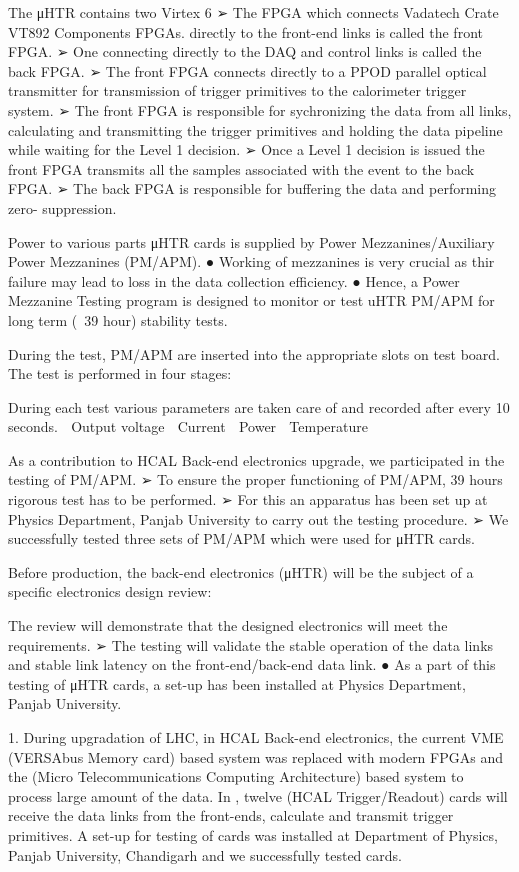 The μHTR contains two Virtex 6
➢ The FPGA which connects
Vadatech Crate VT892
Components
FPGAs.
directly to the front-end links is called the front
FPGA.
➢ One connecting directly to the DAQ and control links is called the back FPGA.
➢ The front FPGA connects directly to a PPOD parallel optical transmitter for
transmission of trigger primitives to the calorimeter trigger system.
➢ The front FPGA is responsible for sychronizing the data from all links,
calculating and transmitting the trigger primitives and holding the data pipeline
while waiting for the Level 1 decision.
➢ Once a Level 1 decision is issued the front FPGA transmits all the samples
associated with the event to the back FPGA.
➢ The back FPGA is responsible for buffering the data and performing zero-
suppression.

Power
to various parts μHTR cards is supplied by Power
Mezzanines/Auxiliary Power Mezzanines (PM/APM).
● Working of mezzanines is very crucial as thir failure may lead to loss in
the data collection efficiency.
● Hence, a Power Mezzanine Testing program is designed to monitor or test
uHTR PM/APM for long term (~39 hour) stability tests.


During
the test, PM/APM are inserted into the appropriate slots on test
board. The test is performed in four stages:

During
each test various parameters are taken care of and recorded after
every 10 seconds.
 Output voltage
 Current
 Power
 Temperature

As
a contribution to HCAL Back-end electronics upgrade, we participated
in the testing of PM/APM.
➢ To
ensure the proper functioning of PM/APM, 39 hours rigorous test
has to be performed.
➢ For this an apparatus has been set up at Physics Department, Panjab
University to carry out the testing procedure.
➢ We successfully tested three sets of PM/APM which were used for
μHTR cards.

Before
production, the back-end electronics (μHTR) will be the subject of a
specific electronics design review:

The
review will demonstrate that the designed electronics will meet the
requirements.
➢ The testing will validate the stable operation of the data links and
stable link latency on the front-end/back-end data link.
● As
a part of this testing of μHTR cards, a set-up has been installed at
Physics Department, Panjab University.


1. During upgradation of LHC, in HCAL Back-end electronics, the current VME (VERSAbus Memory card) based system was replaced with modern FPGAs and the \mtca (Micro Telecommunications Computing Architecture) based system to process large amount of the data. In \mtca, twelve \mhtr (HCAL Trigger/Readout) cards will receive the data links from the front-ends, calculate and transmit trigger primitives. A set-up for testing of \mhtr cards was installed at Department of Physics, Panjab University, Chandigarh and we successfully tested \mhtr cards. 

